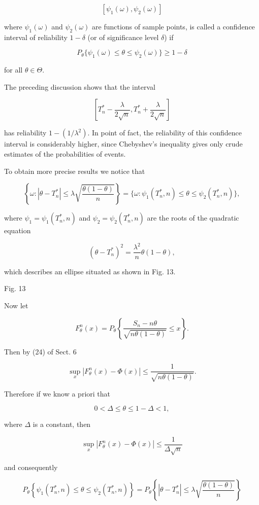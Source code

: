 $$[\psi_1(\omega), \psi_2(\omega)]$$

where $\psi_1(\omega)$ and $\psi_2(\omega)$ are functions of sample points, is called a confidence interval of reliability $1 - \delta$ (or of significance level $\delta$) if

$$P_\theta \{ \psi_1(\omega) \leq \theta \leq \psi_2(\omega) \} \geq 1 - \delta$$

for all $\theta \in \Theta$.

The preceding discussion shows that the interval

$$[T^*_n - \frac{\lambda}{2\sqrt{n}}, T^*_n + \frac{\lambda}{2\sqrt{n}}]$$

has reliability $1 - (1/\lambda^2)$. In point of fact, the reliability of this confidence interval is considerably higher, since Chebyshev’s inequality gives only crude estimates of the probabilities of events.

To obtain more precise results we notice that

$$\left\{ \omega : |\theta - T^*_n| \leq \lambda \sqrt{\frac{\theta(1 - \theta)}{n}} \right\} = \{ \omega : \psi_1(T^*_n, n) \leq \theta \leq \psi_2(T^*_n, n) \},$$

where $\psi_1 = \psi_1(T^*_n, n)$ and $\psi_2 = \psi_2(T^*_n, n)$ are the roots of the quadratic equation

$$(\theta - T^*_n)^2 = \frac{\lambda^2}{n} \theta(1 - \theta),$$

which describes an ellipse situated as shown in Fig. 13.

Fig. 13

Now let

$$F^n_\theta(x) = P_\theta \left\{ \frac{S_n - n\theta}{\sqrt{n\theta(1-\theta)}} \leq x \right\}.$$

Then by (24) of Sect. 6

$$\sup_x |F^n_\theta(x) - \Phi(x)| \leq \frac{1}{\sqrt{n\theta(1-\theta)}}.$$

Therefore if we know a priori that

$$0 < \Delta \leq \theta \leq 1 - \Delta < 1,$$

where $\Delta$ is a constant, then

$$\sup_x |F^n_\theta(x) - \Phi(x)| \leq \frac{1}{\Delta\sqrt{n}}$$

and consequently

$$P_\theta \left\{\psi_1(T^*_n, n) \leq \theta \leq \psi_2(T^*_n, n)\right\} = P_\theta \left\{ |\theta - T^*_n| \leq \lambda \sqrt{\frac{\theta(1-\theta)}{n}} \right\}$$

